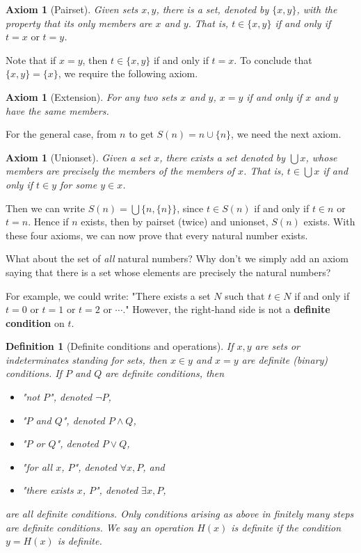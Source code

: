 \documentclass[10pt]{article}
\theoremstyle{newstyle}
\newtheorem{defn}[thm]{Definition}
\newtheorem{axiom}[thm]{Axiom}
\begin{document}
\begin{axiom}[Pairset] 
Given sets $x, y$, there is a set, denoted by $\{x, y\}$, with the property that its only members 
are $x$ and $y$. That is, $t \in \{x, y\}$ if and only if $t = x \text{ or } t = y$.
\end{axiom}

Note that if $x = y$, then $t \in \{x, y\}$ if and only if $t=x$. To conclude that $\{x, y\} = \{x\}$, we 
require the following axiom. 

\begin{axiom}[Extension] 
For any two sets $x$ and $y$, $x = y$ if and only if $x$ and $y$ have the same members. 
\end{axiom}

For the general case, from $n$ to get $S(n) = n \cup \{n\}$, we need the next axiom. 

\begin{axiom}[Unionset] 
Given a set $x$, there exists a set denoted by $\bigcup x$, whose members are precisely the members of 
the members of $x$. That is, $t \in \bigcup x$ if and only if $t \in y$ for some $y \in x$. 
\end{axiom} 

Then we can write $S(n) = \bigcup \{n, \{n\}\}$, since $t \in S(n)$ if and only if $t \in n$ or 
$t = n$. Hence if $n$ exists, then by pairset (twice) and unionset, $S(n)$ exists. 
With these four axioms, we can now prove that every natural number exists. 

What about the set of {\it all} natural numbers? Why don't we simply add an axiom saying that 
there is a set whose elements are precisely the natural numbers? 

For example, we could write: "There exists a set $N$ such that $t \in N$ if and only if 
$t = 0$ or $t = 1$ or $t = 2$ or $\cdots$."
However, the right-hand side is not a {\bf definite condition} on $t$. 

\begin{defn}[Definite conditions and operations] 
If $x, y$ are sets or indeterminates standing for sets, then $x \in y$ and $x = y$ are 
definite (binary) conditions. If $P$ and $Q$ are definite conditions, then 
\begin{itemize} 
\item "not $P$", denoted $\neg P$, 
\item "$P$ and $Q$", denoted $P \wedge Q$, 
\item "$P$ or $Q$", denoted $P \vee Q$, 
\item "for all $x$, $P$", denoted $\forall x, P$, and 
\item "there exists $x$, $P$", denoted $\exists x, P$, 
\end{itemize} 
are all definite conditions. Only conditions arising as above in finitely many steps are definite conditions.
We say an operation $H(x)$ is definite if the condition $y = H(x)$ is definite. 
\end{defn}
\end{document}

